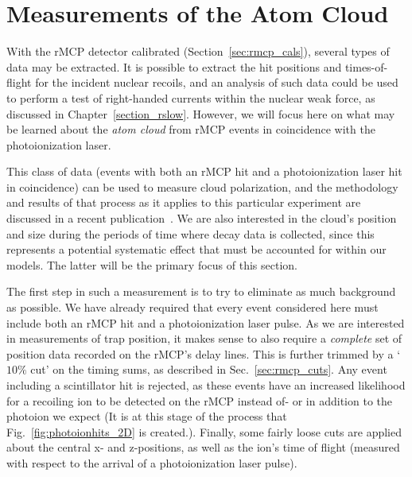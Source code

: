 \section{Measurements of the Atom Cloud}
\label{sec:cloud_calibration}
With the rMCP detector calibrated (Section~\ref{sec:rmcp_cals}), several types of data may be extracted.  It is possible to extract the hit positions and times-of-flight for the incident nuclear recoils, and an analysis of such data could be used to perform a test of right-handed currents within the nuclear weak force, as discussed in Chapter~\ref{section_rslow}.  However, we will focus here on what may be learned about the \emph{atom cloud} from rMCP events in coincidence with the photoionization laser.~  

This class of data (events with both an rMCP hit and a photoionization laser hit in coincidence) can be used to measure cloud polarization, and the methodology and results of that process as it applies to this particular experiment are discussed in a recent publication~\cite{ben_OP}.  We are also interested in the cloud's position and size during the periods of time where decay data is collected, since this represents a potential systematic effect that must be accounted for within our models.  The latter will be the primary focus of this section.  

The first step in such a measurement is to try to eliminate as much background as possible.  We have already required that every event considered here must include both an rMCP hit and a photoionization laser pulse.  As we are interested in measurements of trap position, it makes sense to also require a \emph{complete} set of position data recorded on the rMCP's delay lines.   This is further trimmed by a `$10\%$ cut' on the timing sums, as described in Sec.~\ref{sec:rmcp_cuts}.  Any event including a scintillator hit is rejected, as these events have an increased likelihood for a recoiling ion to be detected on the rMCP instead of- or in addition to the photoion we expect (It is at this stage of the process that Fig.~\ref{fig:photoionhits_2D} is created.).  Finally, some fairly loose cuts are applied about the central x- and z-positions, as well as the ion's time of flight (measured with respect to the arrival of a photoionization laser pulse).

